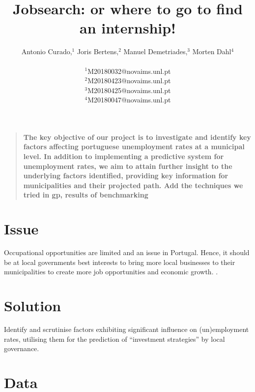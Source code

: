 \documentclass[12pt]{article}
\title{Jobsearch: or where to go to find an internship!}
\author
{Antonio Curado,$^{1}$ Joris Bertens,$^{2}$ Manuel Demetriades,$^{3}$ Morten Dahl$^{4}$\\
\\
\normalsize{$^{1}$M20180032@novaims.unl.pt}\\
\normalsize{$^{2}$M20180423@novaims.unl.pt}\\
\normalsize{$^{3}$M20180425@novaims.unl.pt}\\
\normalsize{$^{4}$M20180047@novaims.unl.pt}\\
}
\date{}
\newenvironment{sciabstract}{%
\begin{quote} \bf}
{\end{quote}}
\begin{document}
 


\baselineskip20pt


\maketitle 




\begin{sciabstract}
  The key objective of our project is to investigate and identify key factors
  affecting portuguese unemployment rates at a municipal level. In addition to
  implementing a predictive system for unemployment rates, we aim to attain further insight to the
  underlying factors identified, providing key information for municipalities and their projected path.
  {\color{red} Add the techniques we tried in gp, results of benchmarking}
\end{sciabstract}



\section*{Issue}



{Occupational opportunities are limited and an issue in Portugal. Hence, it should be at local governments best interests to bring more local businesses to their municipalities to create more job opportunities and economic growth.
}.


\section*{Solution}

{Identify and scrutinise factors exhibiting significant influence on (un)employment rates, utilising them for the prediction of “investment strategies” by local governance.
}

\section*{Data}
\end{document}
